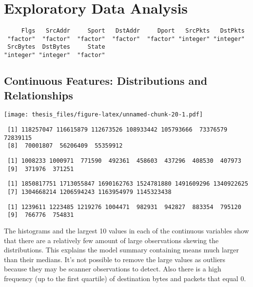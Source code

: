 \documentclass[12pt,twoside]{dukestatscithesis}
\theoremstyle{definition}
\theoremstyle{definition}
\theoremstyle{definition}
\theoremstyle{remark}
\begin{document}
\section{Exploratory Data Analysis}\label{exploratory-data-analysis}
\begin{verbatim}
     Flgs   SrcAddr     Sport   DstAddr     Dport   SrcPkts   DstPkts 
 "factor"  "factor"  "factor"  "factor"  "factor" "integer" "integer" 
 SrcBytes  DstBytes     State 
"integer" "integer"  "factor" 
\end{verbatim}
\subsection{Continuous Features: Distributions and
Relationships}\label{continuous-features-distributions-and-relationships}

\texttt{[image: thesis\_files/figure-latex/unnamed-chunk-20-1.pdf]}
\begin{verbatim}
 [1] 118257047 116615879 112673526 108933442 105793666  73376579  72839115
 [8]  70001807  56206409  55359912
\end{verbatim}
\begin{verbatim}
 [1] 1008233 1000971  771590  492361  458603  437296  408530  407973
 [9]  371976  371251
\end{verbatim}
\begin{verbatim}
 [1] 1850817751 1713055847 1690162763 1524781880 1491609296 1340922625
 [7] 1304668214 1206594243 1163954979 1145323438
\end{verbatim}
\begin{verbatim}
 [1] 1239611 1223485 1219276 1004471  982931  942827  883354  795120
 [9]  766776  754831
\end{verbatim}
The histograms and the largest 10 values in each of the continuous
variables show that there are a relatively few amount of large
observations skewing the distributions. This explains the model summary
containing means much larger than their medians. It's not possible to
remove the large values as outliers because they may be scanner
observations to detect. Also there is a high frequency (up to the first
quartile) of destination bytes and packets that equal 0.
\end{document}
